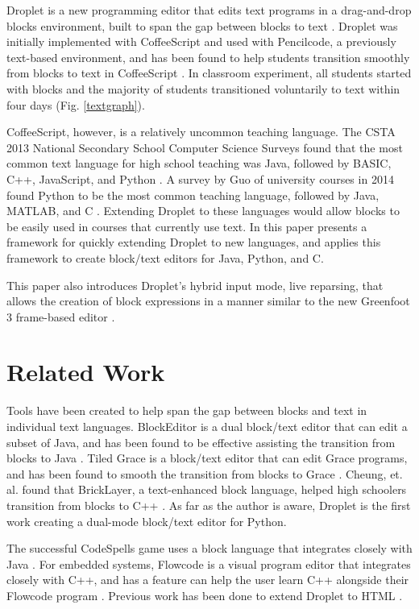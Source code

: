 \documentclass[conference]{IEEEtran}
\begin{document}
Droplet is a new programming editor that edits text programs in a drag-and-drop blocks environment, built to span the gap between blocks to text \cite{Droplet}. Droplet was initially implemented with CoffeeScript and used with Pencilcode, a previously text-based environment, and has been found to help students transition smoothly from blocks to text in CoffeeScript \cite{Droplet}. In classroom experiment, all students started with blocks and the majority of students transitioned voluntarily to text within four days \cite{IDC} (Fig. \ref{textgraph}).

CoffeeScript, however, is a relatively uncommon teaching language. The CSTA 2013 National Secondary School Computer Science Surveys found that the most common text language for high school teaching was Java, followed by BASIC, C++, JavaScript, and Python \cite{CSTA}. A survey by Guo of university courses in 2014 found Python to be the most common teaching language, followed by Java, MATLAB, and C \cite{Guo}. Extending Droplet to these languages would allow blocks to be easily used in courses that currently use text. In this paper presents a framework for quickly extending Droplet to new languages, and applies this framework to create block/text editors for Java, Python, and C.

This paper also introduces Droplet's hybrid input mode, live reparsing, that allows the creation of block expressions in a manner similar to the new Greenfoot 3 frame-based editor \cite{Greenfoot3}.

\section{Related Work}

Tools have been created to help span the gap between blocks and text in individual text languages. BlockEditor is a dual block/text editor that can edit a subset of Java, and has been found to be effective assisting the transition from blocks to Java \cite{Matsuzawa}. Tiled Grace is a block/text editor that can edit Grace programs, and has been found to smooth the transition from blocks to Grace \cite{TiledGrace}. Cheung, et. al. found that BrickLayer, a text-enhanced block language, helped high schoolers transition from blocks to C++ \cite{Cheung}. As far as the author is aware, Droplet is the first work creating a dual-mode block/text editor for Python.

The successful CodeSpells game uses a block language that integrates closely with Java \cite{CodeSpells}. For embedded systems, Flowcode is a visual program editor that integrates closely with C++, and has a feature can help the user learn C++ alongside their Flowcode program \cite{Flowcode}. Previous work has been done to extend Droplet to HTML \cite{Aggarwal}.
\end{document}
